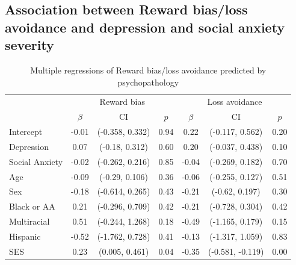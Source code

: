 \documentclass[english,man,floatsintext]{apa6}
\begin{document}
\hypertarget{association-between-reward-biasloss-avoidance-and-depression-and-social-anxiety-severity}{%
\subsection{Association between Reward bias/loss avoidance and depression and social anxiety severity}\label{association-between-reward-biasloss-avoidance-and-depression-and-social-anxiety-severity}}

\begin{table}[tbp]

\begin{center}
\begin{threeparttable}

\caption{\label{tab:unnamed-chunk-6}Multiple regressions of Reward bias/loss avoidance predicted by psychopathology}

\begin{tabular}{lcccccc}
\toprule
 \multicolumn{1}{c}{ } & \multicolumn{3}{c}{Reward bias} & \multicolumn{3}{c}{Loss avoidance} \\
\cmidrule(r){1-1} \cmidrule(r){2-4} \cmidrule(r){5-7}
  & $\beta$ & CI & $p$ & $\beta$ & CI & $p$\\
\midrule
Intercept & -0.01 & (-0.358, 0.332) & 0.94 & 0.22 & (-0.117, 0.562) & 0.20\\
Depression & 0.07 & (-0.18, 0.312) & 0.60 & 0.20 & (-0.037, 0.438) & 0.10\\
Social Anxiety & -0.02 & (-0.262, 0.216) & 0.85 & -0.04 & (-0.269, 0.182) & 0.70\\
Age & -0.09 & (-0.29, 0.106) & 0.36 & -0.06 & (-0.255, 0.127) & 0.51\\
Sex & -0.18 & (-0.614, 0.265) & 0.43 & -0.21 & (-0.62, 0.197) & 0.30\\
Black or AA & 0.21 & (-0.296, 0.709) & 0.42 & -0.21 & (-0.728, 0.304) & 0.42\\
Multiracial & 0.51 & (-0.244, 1.268) & 0.18 & -0.49 & (-1.165, 0.179) & 0.15\\
Hispanic & -0.52 & (-1.762, 0.728) & 0.41 & -0.13 & (-1.317, 1.059) & 0.83\\
SES & 0.23 & (0.005, 0.461) & 0.04 & -0.35 & (-0.581, -0.119) & 0.00\\
\bottomrule
\end{tabular}

\end{threeparttable}
\end{center}

\end{table}
\end{document}
